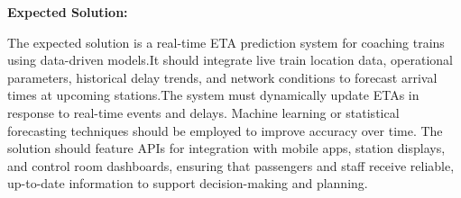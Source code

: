 \documentclass[10pt,a4paper]{article}
\begin{document}
\begin{tcolorbox}[pscard, title={"\textbf{SIH26028} \quad $\vert$ \quad Dynamic Forecast of Expected Time of Arrival (ETA) for Coaching Trains}]
\vspace{0.18cm}\noindent\textbf{\color{sihnavy}Expected Solution:}\par\vspace{0.06cm}
\noindent\small The expected solution is a real-time ETA prediction system for coaching trains using data-driven models.It should integrate live train location data, operational parameters, historical delay trends, and network conditions to forecast arrival times at upcoming stations.The system must dynamically update ETAs in response to real-time events and delays. Machine learning or statistical forecasting techniques should be employed to improve accuracy over time. The solution should feature APIs for integration with mobile apps, station displays, and control room dashboards, ensuring that passengers and staff receive reliable, up-to-date information to support decision-making and planning.\par\vspace{0.06cm}

\end{tcolorbox}
\vspace{0.4cm}
{}
\end{document}
